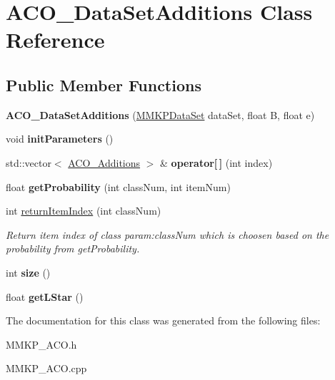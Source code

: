 \hypertarget{class_a_c_o___data_set_additions}{\section{A\+C\+O\+\_\+\+Data\+Set\+Additions Class Reference}
\label{class_a_c_o___data_set_additions}
}
\subsection*{Public Member Functions}
\begin{DoxyCompactItemize}
\item 
\hypertarget{class_a_c_o___data_set_additions_a65bc5fa2a5dfe8c3446e7bf665925884}{{\bfseries A\+C\+O\+\_\+\+Data\+Set\+Additions} (\hyperlink{class_m_m_k_p_data_set}{M\+M\+K\+P\+Data\+Set} data\+Set, float B, float e)}\label{class_a_c_o___data_set_additions_a65bc5fa2a5dfe8c3446e7bf665925884}

\item 
\hypertarget{class_a_c_o___data_set_additions_acb4683b5e0e2c1637a0d0f209f0e009f}{void {\bfseries init\+Parameters} ()}\label{class_a_c_o___data_set_additions_acb4683b5e0e2c1637a0d0f209f0e009f}

\item 
\hypertarget{class_a_c_o___data_set_additions_a855bf4c428538e512ce2840e2f37f0e5}{std\+::vector$<$ \hyperlink{structaco__additions}{A\+C\+O\+\_\+\+Additions} $>$ \& {\bfseries operator\mbox{[}$\,$\mbox{]}} (int index)}\label{class_a_c_o___data_set_additions_a855bf4c428538e512ce2840e2f37f0e5}

\item 
\hypertarget{class_a_c_o___data_set_additions_aa271743dc8b4ecf7f6a4dae809004e44}{float {\bfseries get\+Probability} (int class\+Num, int item\+Num)}\label{class_a_c_o___data_set_additions_aa271743dc8b4ecf7f6a4dae809004e44}

\item 
\hypertarget{class_a_c_o___data_set_additions_af37d18439c4e8aaf238f508eb34ae5d3}{int \hyperlink{class_a_c_o___data_set_additions_af37d18439c4e8aaf238f508eb34ae5d3}{return\+Item\+Index} (int class\+Num)}\label{class_a_c_o___data_set_additions_af37d18439c4e8aaf238f508eb34ae5d3}

\begin{DoxyCompactList}\small\item\em Return item index of class param\+:class\+Num which is choosen based on the probability from get\+Probability. \end{DoxyCompactList}\item 
\hypertarget{class_a_c_o___data_set_additions_a932f50ad94604db8bf4a1de5c4aed71b}{int {\bfseries size} ()}\label{class_a_c_o___data_set_additions_a932f50ad94604db8bf4a1de5c4aed71b}

\item 
\hypertarget{class_a_c_o___data_set_additions_afc02c443ea03a0a759238b5419905d8a}{float {\bfseries get\+L\+Star} ()}\label{class_a_c_o___data_set_additions_afc02c443ea03a0a759238b5419905d8a}

\end{DoxyCompactItemize}


The documentation for this class was generated from the following files\+:\begin{DoxyCompactItemize}
\item 
M\+M\+K\+P\+\_\+\+A\+C\+O.\+h\item 
M\+M\+K\+P\+\_\+\+A\+C\+O.\+cpp\end{DoxyCompactItemize}
